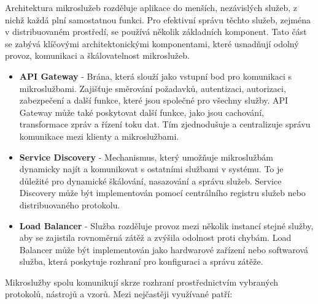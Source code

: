 
Architektura mikroslužeb rozděluje aplikace do menších, nezávislých služeb, z nichž každá plní samostatnou funkci. Pro efektivní správu těchto služeb, zejména v distribuovaném prostředí, se používá několik základních komponent. \cite{Williams2023} Tato část se zabývá klíčovými architektonickými komponentami, které usnadňují odolný provoz, komunikaci a škálovatelnost mikroslužeb. 


\begin{itemize}
    \item \textbf{API Gateway} - Brána, která slouží jako vstupní bod pro komunikaci s mikroslužbami. Zajišťuje směrování požadavků, autentizaci, autorizaci, zabezpečení a další funkce, které jsou společné pro všechny služby. API Gateway může také poskytovat další funkce, jako jsou cachování, transformace zpráv a řízení toku dat. Tím zjednodušuje a centralizuje správu komunikace mezi klienty a mikroslužbami.
    \item \textbf{Service Discovery} - Mechanismus, který umožňuje mikroslužbám dynamicky najít a komunikovat s ostatními službami v systému. To je důležité pro dynamické škálování, nasazování a správu služeb. Service Discovery může být implementován pomocí centrálního registru služeb nebo distribuovaného protokolu. \cite{Richardson2018}
    \item \textbf{Load Balancer} - Služba rozděluje provoz mezi několik instancí stejné služby, aby se zajistila rovnoměrná zátěž a zvýšila odolnost proti chybám. Load Balancer může být implementován jako hardwarové zařízení nebo softwarová služba, která poskytuje rozhraní pro konfiguraci a správu zátěže.
\end{itemize}


Mikroslužby spolu komunikují skrze rozhraní prostřednictvím vybraných protokolů, nástrojů a vzorů. Mezi nejčastěji využívané patří:

